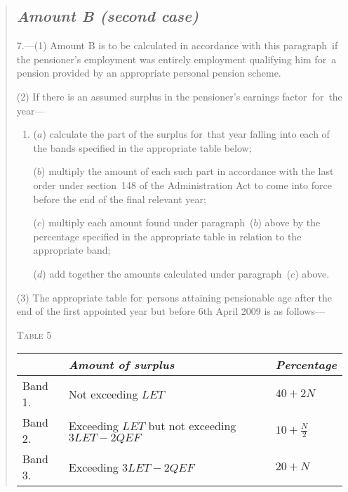 \documentclass[12pt,a4paper]{article}
\begin{document}
\begin{quotation}
\subsection*{\itshape Amount B (second case)}

7.---(1) Amount B is to be calculated in accordance with this paragraph~if the pensioner’s employment was entirely employment qualifying him for~a pension provided by an appropriate personal pension scheme.

(2) If there is an assumed surplus in the pensioner’s earnings factor~for~the year—
\begin{enumerate}\item[]
($a$) calculate the part of the surplus for~that year falling into each of the bands specified in the appropriate table below;

($b$) multiply the amount of each such part in accordance with the last order under section~148 of the Administration Act to come into force before the end of the final relevant year;

($c$) multiply each amount found under paragraph~($b$)  above by the percentage specified in the appropriate table in relation to the appropriate band;

\begin{sloppypar}
($d$) add together the amounts calculated under paragraph~($c$)  above.
\end{sloppypar}
\end{enumerate}

(3) The appropriate table for~persons attaining pensionable age after the end of the first appointed year but before 6th April 2009 is as follows—

\medskip

\noindent\textsc{Table 5}

{\noindent\footnotesize
\begin{longtable}{lll}
\hline
&\itshape Amount of surplus	&\itshape Percentage\\
\hline
\endhead
\hline
\endlastfoot
Band 1. 	&Not exceeding $LET$	&$40 + 2N$\\
Band 2. 	&Exceeding $LET$ but not exceeding $3LET - 2QEF$	&$10 + \frac{N}{2}$\\
Band 3. 	&Exceeding $3LET - 2QEF$	&$20 + N$\\
\end{longtable}

}
\end{quotation}
\end{document}
